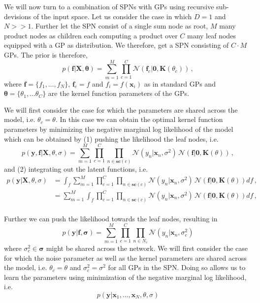 \documentclass[10pt,letterpaper]{article}
\newcommand\N{\ensuremath{\mathcal{N}}}
\newcommand{\X}{\mathbf{X}}
\newcommand{\K}{\mathbf{K}}
\newcommand{\x}{\mathbf{x}}
\newcommand{\y}{\mathbf{y}}
\newcommand{\scope}{\ensuremath{\mathbf{sc}}} %
\theoremstyle{mystyle}
\begin{document}
We will now turn to a combination of SPNs with GPs using recursive sub-devisions of the input space.
Let us consider the case in which $D=1$ and $N>>1$.
Further let the SPN consist of a single sum node as root, $M$ many product nodes as children each computing a product over $C$ many leaf nodes equipped with a GP as distribution.
We therefore, get a SPN consisting of $C\cdot M$ GPs. The prior is therefore,
\[
  p(\bm f | \X, \bm \theta) = \sum_{m=1}^M \prod_{c=1}^C \N(\bm f_c | \bm 0, \K(\theta_c)) \, ,
\]
where $\bm f = \{f_1, \dots, f_N\}$, $\bm f_c = {f}$ and $f_i = f(\x_i)$ as in standard GPs and $\bm \theta = \{\theta_1, \dots \theta_C\}$ are the kernel function parameters of the GPs.

We will first consider the case for which the parameters are shared across the model, i.e. $\theta_c = \theta$.
In this case we can obtain the optimal kernel function parameters by minimizing the negative marginal log likelihood of the model which can be obtained by (1) pushing the likelihood the leaf nodes, i.e.
\[
  p(\y, \bm f | \X, \theta, \sigma) = \sum_{m=1}^M \prod_{c=1}^C \prod_{n \in \scope(c)} \N(y_n | \x_n, \sigma^2) \, \N(\bm f | \bm 0, \K(\theta)) \, ,
\]
and (2) integrating out the latent functions, i.e.
\begin{align}
  p(\y | \X, \theta, \sigma) &= \int_f \sum_{m=1}^M \prod_{c=1}^C \prod_{n \in \scope(c)} \N(y_n | \x_n, \sigma^2) \, \N(\bm f | \bm 0, \K(\theta)) df \, , \\
  &= \sum_{m=1}^M \int_f \prod_{c=1}^C \prod_{n \in \scope(c)} \N(y_n | \x_n, \sigma^2) \, \N(\bm f | \bm 0, \K(\theta)) df \, , \\
\end{align}

Further we can push the likelihood towards the leaf nodes, resulting in
\[
  p(\y | \bm f, \bm \sigma) = \sum_{m=1}^M \prod_{c=1}^C \prod_{n \in N_c} \N(y_n | \x_n, \sigma^2_c)
\]
where $\sigma^2_c \in \bm \sigma$ might be shared across the network.
We will first consider the case for which the noise parameter as well as the kernel parameters are shared across the model, i.e. $\theta_c = \theta$ and $\sigma^2_c = \sigma^2$ for all GPs in the SPN.
Doing so allows us to learn the parameters using minimization of the negative marginal log likelihood, i.e.
\[
  p(\y | \x_1, \dots, \x_N, \theta, \sigma)
\]
\end{document}

